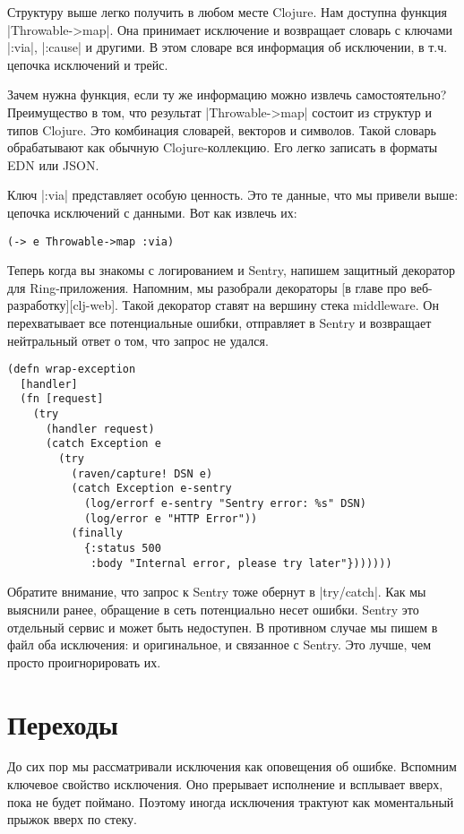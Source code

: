 Структуру выше легко получить в любом месте Clojure. Нам доступна функция
\spverb|Throwable->map|. Она принимает исключение и возвращает словарь с ключами
\spverb|:via|, \spverb|:cause| и другими. В этом словаре вся информация об исключении, в
т.ч. цепочка исключений и трейс.

Зачем нужна функция, если ту же информацию можно извлечь самостоятельно?
Преимущество в том, что результат \spverb|Throwable->map| состоит из структур и типов
Clojure. Это комбинация словарей, векторов и символов. Такой словарь
обрабатывают как обычную Clojure-коллекцию. Его легко записать в форматы EDN или
JSON.

Ключ \spverb|:via| представляет особую ценность. Это те данные, что мы привели выше:
цепочка исключений с данными. Вот как извлечь их:

\begin{verbatim}
(-> e Throwable->map :via)
\end{verbatim}

Теперь когда вы знакомы с логированием и Sentry, напишем защитный декоратор для
Ring-приложения. Напомним, мы разобрали декораторы [в главе про
веб-разработку][clj-web]. Такой декоратор ставят на вершину стека middleware. Он
перехватывает все потенциальные ошибки, отправляет в Sentry и возвращает
нейтральный ответ о том, что запрос не удался.

\begin{verbatim}
(defn wrap-exception
  [handler]
  (fn [request]
    (try
      (handler request)
      (catch Exception e
        (try
          (raven/capture! DSN e)
          (catch Exception e-sentry
            (log/errorf e-sentry "Sentry error: %s" DSN)
            (log/error e "HTTP Error"))
          (finally
            {:status 500
             :body "Internal error, please try later"}))))))
\end{verbatim}

Обратите внимание, что запрос к Sentry тоже обернут в \spverb|try/catch|. Как мы
выяснили ранее, обращение в сеть потенциально несет ошибки. Sentry это отдельный
сервис и может быть недоступен. В противном случае мы пишем в файл оба
исключения: и оригинальное, и связанное с Sentry. Это лучше, чем просто
проигнорировать их.

\section{Переходы}

До сих пор мы рассматривали исключения как оповещения об ошибке. Вспомним
ключевое свойство исключения. Оно прерывает исполнение и всплывает вверх, пока
не будет поймано. Поэтому иногда исключения трактуют как моментальный прыжок
вверх по стеку.

